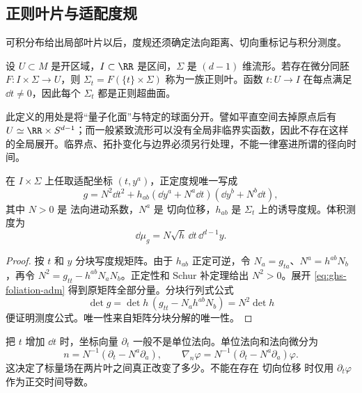 \subsection{正则叶片与适配度规}

可积分布给出局部叶片以后，度规还须确定法向距离、切向重标记与积分测度。

\begin{definition}[正则叶状分解]
\label{def:ghs-regular-foliation}
设 $U\subset M$ 是开区域，$I\subset\RR$ 是区间，$\Sigma$ 是 $(d-1)$ 维流形。若存在微分同胚 $F:I\times\Sigma\longrightarrow U$，则 $\Sigma_t=F(\{t\}\times\Sigma)$ 称为一族正则叶。函数 $t:U\to I$ 在每点满足 $\dd t\neq 0$，因此每个 $\Sigma_t$ 都是正则超曲面。
\end{definition}

此定义的用处是将“量子化面”与特定的球面分开。譬如平直空间去掉原点后有 $U\simeq\RR\times S^{d-1}$；而一般紧致流形可以没有全局非临界实函数，因此不存在这样的全局展开。临界点、拓扑变化与边界必须另行处理，不能一律塞进所谓的径向时间。

\begin{proposition}[叶状度规的分解]
\label{prop:ghs-foliation-metric}
在 $I\times\Sigma$ 上任取适配坐标 $(t,y^a)$，正定度规唯一写成
\begin{equation}\label{eq:ghs-foliation-adm}
 g=N^2\dd t^2+h_{ab}(\dd y^a+N^a\dd t)(\dd y^b+N^b\dd t),
\end{equation}
其中 $N>0$ 是 法向进动系数，$N^a$ 是 切向位移，$h_{ab}$ 是 $\Sigma_t$ 上的诱导度规。体积测度为
\begin{equation}\label{eq:ghs-foliation-volume}
 \dd\mu_g=N\sqrt{h}\,\dd t\,\dd^{d-1}y.
\end{equation}
\end{proposition}
\begin{proof}
按 $t$ 和 $y$ 分块写度规矩阵。由于 $h_{ab}$ 正定可逆，令 $N_a=g_{ta}$、$N^a=h^{ab}N_b$，再令 $N^2=g_{tt}-h^{ab}N_aN_b$。正定性和 Schur 补定理给出 $N^2>0$。展开 \cref{eq:ghs-foliation-adm} 得到原矩阵全部分量。分块行列式公式
\[
 \det g=\det h\,(g_{tt}-N_ah^{ab}N_b)=N^2\det h
\]
便证明测度公式。唯一性来自矩阵分块分解的唯一性。
\end{proof}

把 $t$ 增加 $\dd t$ 时，坐标向量 $\partial_t$ 一般不是单位法向。单位法向和法向微分为
\[
 n=N^{-1}(\partial_t-N^a\partial_a),\qquad
 \nabla_n\varphi=N^{-1}(\partial_t-N^a\partial_a)\varphi.
\]
这决定了标量场在两片叶之间真正改变了多少。不能在存在 切向位移 时仅用 $\partial_t\varphi$ 作为正交时间导数。
